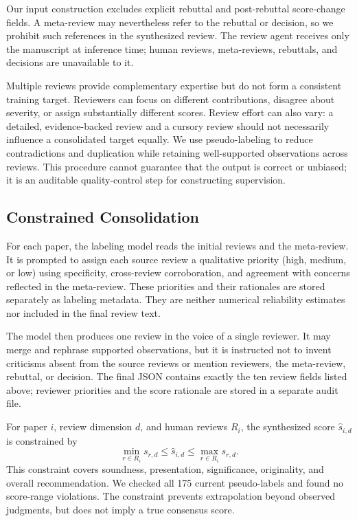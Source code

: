 \documentclass{article}
\begin{document}
Our input construction excludes explicit rebuttal and post-rebuttal score-change fields. A meta-review may nevertheless refer to the rebuttal or decision, so we prohibit such references in the synthesized review. The review agent receives only the manuscript at inference time; human reviews, meta-reviews, rebuttals, and decisions are unavailable to it.

Multiple reviews provide complementary expertise but do not form a consistent training target. Reviewers can focus on different contributions, disagree about severity, or assign substantially different scores. Review effort can also vary: a detailed, evidence-backed review and a cursory review should not necessarily influence a consolidated target equally. We use pseudo-labeling to reduce contradictions and duplication while retaining well-supported observations across reviews. This procedure cannot guarantee that the output is correct or unbiased; it is an auditable quality-control step for constructing supervision.

\subsection{Constrained Consolidation}

For each paper, the labeling model reads the initial reviews and the meta-review. It is prompted to assign each source review a qualitative priority (high, medium, or low) using specificity, cross-review corroboration, and agreement with concerns reflected in the meta-review. These priorities and their rationales are stored separately as labeling metadata. They are neither numerical reliability estimates nor included in the final review text.

The model then produces one review in the voice of a single reviewer. It may merge and rephrase supported observations, but it is instructed not to invent criticisms absent from the source reviews or mention reviewers, the meta-review, rebuttal, or decision. The final JSON contains exactly the ten review fields listed above; reviewer priorities and the score rationale are stored in a separate audit file.

For paper $i$, review dimension $d$, and human reviews $R_i$, the synthesized score $\hat{s}_{i,d}$ is constrained by
\begin{equation}
  \min_{r\in R_i}s_{r,d}\leq \hat{s}_{i,d}\leq\max_{r\in R_i}s_{r,d}.
\end{equation}
This constraint covers soundness, presentation, significance, originality, and overall recommendation. We checked all 175 current pseudo-labels and found no score-range violations. The constraint prevents extrapolation beyond observed judgments, but does not imply a true consensus score.
\end{document}
